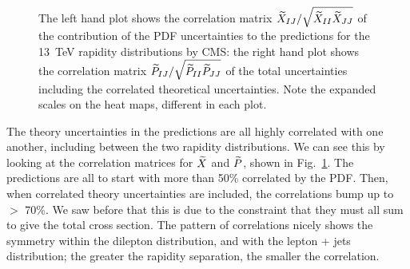 \begin{figure}[h]
    \begin{center}
    \end{center}
  \vspace{-0.55cm}
  \caption{The left hand plot shows the correlation matrix $\widetilde{X}_{IJ}/\sqrt{\widetilde{X}_{II}\widetilde{X}_{JJ}}$ of the contribution of the PDF uncertainties to the predictions for the 13~TeV rapidity distributions by CMS: the right hand plot shows the correlation matrix $\widetilde{P}_{IJ}/\sqrt{\widetilde{P}_{II}\widetilde{P}_{JJ}}$ of the total uncertainties including the correlated theoretical uncertainties. Note the expanded scales on the heat maps, different in each plot.} 
  \label{fig:CMSttbarcorrlns}
\end{figure}

The theory uncertainties in the predictions are all highly correlated with one another, including between the two rapidity distributions. We can see this by looking at the correlation matrices for $\widetilde{X}$ and $\widetilde{P}$, shown in 
Fig.~\ref{fig:CMSttbarcorrlns}. The predictions are all to start with more than 50\% correlated by the PDF. Then, when correlated theory uncertainties are included, the correlations bump up to $>$ 70\%. We saw before that this is due to the constraint that they must all sum to give the total cross section. The pattern of correlations nicely shows the symmetry within the dilepton distribution, and with the lepton + jets distribution; the greater the rapidity separation, the smaller the correlation.

